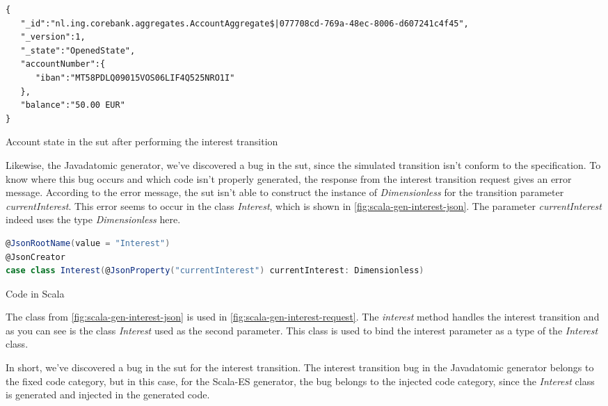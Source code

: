 \begin{sourcecode}[h!]
\begin{lstlisting}[]
{
   "_id":"nl.ing.corebank.aggregates.AccountAggregate$|077708cd-769a-48ec-8006-d607241c4f45",
   "_version":1,
   "_state":"OpenedState",
   "accountNumber":{
      "iban":"MT58PDLQ09015VOS06LIF4Q525NRO1I"
   },
   "balance":"50.00 EUR"
}
\end{lstlisting}
\caption{Account state in the \gls{sut} after performing the interest transition}\label{fig:interest-opened-account-scalaes-json}
\end{sourcecode}
\FloatBarrier

Likewise, the Javadatomic generator, we've discovered a bug in the \gls{sut}, since
the simulated transition isn't conform to the specification. To know where this
bug occurs and which code isn't properly generated, the response from the
interest transition request gives an error message. According to the error
message, the \gls{sut} isn't able to construct the instance of \textit{Dimensionless}
for the transition parameter \textit{currentInterest}. This error seems to occur
in the class \textit{Interest}, which is shown in
\autoref{fig:scala-gen-interest-json}. The parameter \textit{currentInterest}
indeed uses the type \textit{Dimensionless} here.

\begin{sourcecode}[h!]
\begin{lstlisting}[language=scala]
@JsonRootName(value = "Interest")
@JsonCreator
case class Interest(@JsonProperty("currentInterest") currentInterest: Dimensionless)
\end{lstlisting}
\caption{Code in Scala}\label{fig:scala-gen-interest-json}
\end{sourcecode}
\FloatBarrier

The class from \autoref{fig:scala-gen-interest-json} is used in
\autoref{fig:scala-gen-interest-request}. The \textit{interest} method handles
the interest transition and as you can see is the class \textit{Interest} used
as the second parameter. This class is used to bind the interest parameter as a
type of the \textit{Interest} class.

In short, we've discovered a bug in the \gls{sut}
for the interest transition. The interest transition bug in the Javadatomic
generator belongs to the fixed code category, but in this case, for the Scala-ES
generator, the bug belongs to the injected code category, since the
\textit{Interest} class is generated and injected in the generated code.

